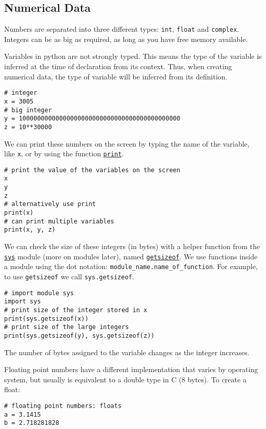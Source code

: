 \documentclass[12pt, a4paper]{article}
\begin{document}
\subsection{Numerical Data}
\label{sec:org86d318c}
Numbers are separated into three different types: \texttt{int}, \texttt{float} and \texttt{complex}.
Integers can be as big as required, as long as you have free memory available.

Variables in python are not strongly typed.
This means the type of the variable is inferred at the time of declaration from its context.
Thus, when creating numerical data, the type of variable will be inferred from its definition.

\lstset{language=jupyter-python,label= ,caption= ,captionpos=b,numbers=none}
\begin{lstlisting}
# integer
x = 3005
# big integer
y = 10000000000000000000000000000000000000000000
z = 10**30000
\end{lstlisting}

We can print these numbers on the screen by typing the name of the variable, like \texttt{x}, or by using the function \href{https://docs.python.org/3.6/library/functions.html\#print}{\texttt{print}}.
\lstset{language=jupyter-python,label= ,caption= ,captionpos=b,numbers=none}
\begin{lstlisting}
# print the value of the variables on the screen
x
y
z
# alternatively use print
print(x)
# can print multiple variables
print(x, y, z)
\end{lstlisting}

We can check the size of these integers (in bytes) with a helper function from the \href{https://docs.python.org/3.6/library/sys.html?module-sys\#module-sys}{\texttt{sys}} module (more on modules later), named \href{https://docs.python.org/3.6/library/sys.html?highlight=sys\#sys.getsizeof}{\texttt{getsizeof}}.
We use functions inside a module using the dot notation: \texttt{module\_name.name\_of\_function}.
For example, to use \texttt{getsizeof} we call \texttt{sys.getsizeof}.
\lstset{language=jupyter-python,label= ,caption= ,captionpos=b,numbers=none}
\begin{lstlisting}
# import module sys
import sys
# print size of the integer stored in x
print(sys.getsizeof(x))
# print size of the large integers
print(sys.getsizeof(y), sys.getsizeof(z))
\end{lstlisting}
The number of bytes assigned to the variable changes as the integer increases.

Floating point numbers have a different implementation that varies by operating system, but usually is equivalent to a double type in C (8 bytes).
To create a float:
\lstset{language=jupyter-python,label= ,caption= ,captionpos=b,numbers=none}
\begin{lstlisting}
# floating point numbers: floats
a = 3.1415
b = 2.718281828
\end{lstlisting}
\end{document}
